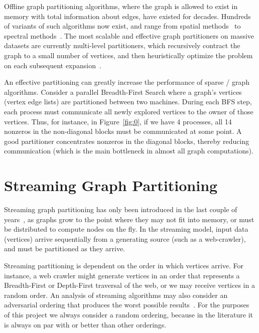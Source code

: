 \documentclass[11pt]{article}
\begin{document}

Offline graph partitioning algorithms, where the graph is allowed to exist in memory with total information about edges, have existed for decades. Hundreds of variants of such algorithms now exist, and range from spatial methods~\cite{Gilbert95geometricmesh} to spectral methods~\cite{arora2009expander}. The most scalable and effective graph partitioners on massive datasets are currently multi-level partitioners, which recursively contract the graph to a small number of vertices, and then heuristically optimize the problem on each subsequent expansion~\cite{karypis1998multilevel}. 

An effective partitioning can greatly increase the performance of sparse / graph algorithms. Consider a parallel Breadth-First Search where a graph's vertices (vertex edge lists) are partitioned between two machines. During each BFS step, each process must communicate all newly explored vertices to the owner of those vertices. Thus, for instance, in Figure~\ref{fig:0}, if we have 4 processes, all 14 nonzeros in the non-diagonal blocks must be communicated at some point. A good partitioner concentrates nonzeros in the diagonal blocks, thereby reducing communication (which is the main bottleneck in almost all graph computations). 

\section{Streaming Graph Partitioning}\vspace{-10 pt}
Streaming graph partitioning has only been introduced in the last couple of years~\cite{DBLP:journals/corr/abs-1212-1121,Stanton:2012:SGP:2339530.2339722,tsourakakis2012fennel}, as graphs grow to the point where they may not fit into memory, or must be distributed to compute nodes on the fly. In the streaming model, input data (vertices) arrive sequentially from a generating source (such as a web-crawler), and must be partitioned as they arrive.

Streaming partitioning is dependent on the order in which vertices arrive. For instance, a web crawler might generate vertices in an order that represents a Breadth-First or Depth-First traversal of the web, or we may receive vertices in a random order. An analysis of streaming algorithms may also consider an adversarial ordering that produces the worst possible results~\cite{Stanton:2012:SGP:2339530.2339722}. For the purposes of this project we always consider a random ordering, because in the literature it is always on par with or better than other orderings. 
\end{document}
